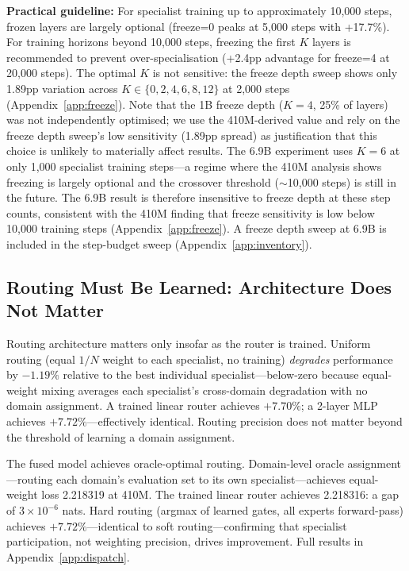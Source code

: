 \documentclass{article}
\begin{document}
\textbf{Practical guideline:} For specialist training up to approximately 10,000 steps, frozen layers are largely optional (freeze=0 peaks at 5,000 steps with +17.7\%). For training horizons beyond 10,000 steps, freezing the first $K$ layers is recommended to prevent over-specialisation (+2.4pp advantage for freeze=4 at 20,000 steps). The optimal $K$ is not sensitive: the freeze depth sweep shows only 1.89pp variation across $K \in \{0, 2, 4, 6, 8, 12\}$ at 2,000 steps (Appendix~\ref{app:freeze}). Note that the 1B freeze depth ($K=4$, 25\% of layers) was not independently optimised; we use the 410M-derived value and rely on the freeze depth sweep's low sensitivity (1.89pp spread) as justification that this choice is unlikely to materially affect results. The 6.9B experiment uses $K=6$ at only 1,000 specialist training steps---a regime where the 410M analysis shows freezing is largely optional and the crossover threshold ($\sim$10,000 steps) is still in the future. The 6.9B result is therefore insensitive to freeze depth at these step counts, consistent with the 410M finding that freeze sensitivity is low below 10,000 training steps (Appendix~\ref{app:freeze}). A freeze depth sweep at 6.9B is included in the step-budget sweep (Appendix~\ref{app:inventory}).

\subsection{Routing Must Be Learned: Architecture Does Not Matter}
\label{sec:failure}

Routing architecture matters only insofar as the router is trained. Uniform routing (equal $1/N$ weight to each specialist, no training) \emph{degrades} performance by $-1.19\%$ relative to the best individual specialist---below-zero because equal-weight mixing averages each specialist's cross-domain degradation with no domain assignment. A trained linear router achieves $+7.70\%$; a 2-layer MLP achieves $+7.72\%$---effectively identical. Routing precision does not matter beyond the threshold of learning a domain assignment.

The fused model achieves oracle-optimal routing. Domain-level oracle assignment---routing each domain's evaluation set to its own specialist---achieves equal-weight loss 2.218319 at 410M. The trained linear router achieves 2.218316: a gap of $3 \times 10^{-6}$ nats. Hard routing (argmax of learned gates, all experts forward-pass) achieves $+7.72\%$---identical to soft routing---confirming that specialist participation, not weighting precision, drives improvement. Full results in Appendix~\ref{app:dispatch}.
\end{document}
